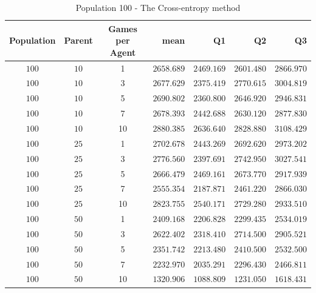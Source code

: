\begin{table}[H]
\centering
\small
\begin{tabular}{c c c r r r r}
Population & Parent & Games per Agent & mean & Q1 & Q2 & Q3\\
\hline
$100$ & $10$ & 1 & $2658.689$ & $2469.169$ & $2601.480$ & $2866.970$\\
$100$ & $10$ & 3 & $2677.629$ & $2375.419$ & $2770.615$ & $3004.819$\\
$100$ & $10$ & 5 & $2690.802$ & $2360.800$ & $2646.920$ & $2946.831$\\
$100$ & $10$ & 7 & $2678.393$ & $2442.688$ & $2630.120$ & $2877.830$\\
\hdashline
$100$ & $10$ & 10 & $2880.385$ & $2636.640$ & $2828.880$ & $3108.429$\\
\hdashline
$100$ & $25$ & 1 & $2702.678$ & $2443.269$ & $2692.620$ & $2973.202$\\
\hdashline
$100$ & $25$ & 3 & $2776.560$ & $2397.691$ & $2742.950$ & $3027.541$\\
\hdashline
$100$ & $25$ & 5 & $2666.479$ & $2469.161$ & $2673.770$ & $2917.939$\\
$100$ & $25$ & 7 & $2555.354$ & $2187.871$ & $2461.220$ & $2866.030$\\
$100$ & $25$ & 10 & $2823.755$ & $2540.171$ & $2729.280$ & $2933.510$\\
$100$ & $50$ & 1 & $2409.168$ & $2206.828$ & $2299.435$ & $2534.019$\\
\hdashline
$100$ & $50$ & 3 & $2622.402$ & $2318.410$ & $2714.500$ & $2905.521$\\
\hdashline
$100$ & $50$ & 5 & $2351.742$ & $2213.480$ & $2410.500$ & $2532.500$\\
$100$ & $50$ & 7 & $2232.970$ & $2035.291$ & $2296.430$ & $2466.811$\\
$100$ & $50$ & 10 & $1320.906$ & $1088.809$ & $1231.050$ & $1618.431$\\
\end{tabular}
\caption{Population 100 - The Cross-entropy method}
\end{table}


